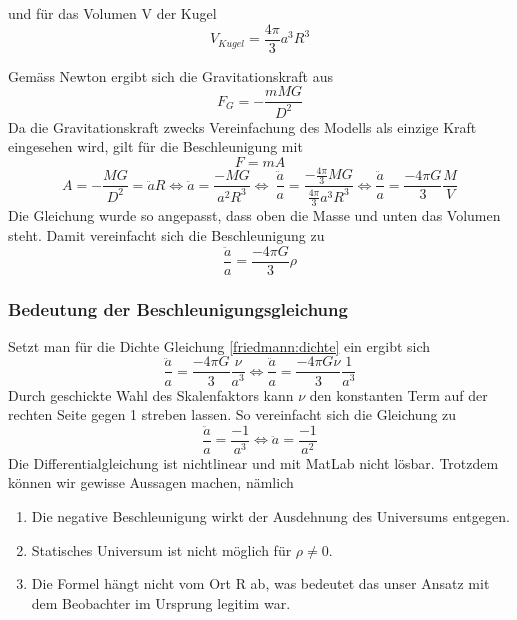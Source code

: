 \begin{refsection}
und für das Volumen V der Kugel
\[V_{Kugel} = \frac{4 \pi }{3} a^3 R^3\]

Gemäss Newton ergibt sich die Gravitationskraft aus
\begin{equation}
F_G = -\frac{m M G}{D^2}
\end{equation}
Da die Gravitationskraft zwecks Vereinfachung des Modells als einzige Kraft eingesehen wird, gilt für die Beschleunigung mit 
\[F = m A\]
\[A = - \frac{M G}{D^2} = \ddot{a} R \Leftrightarrow \ddot{a} = \frac{- M G}{a^2 R^3} \Leftrightarrow\ \frac{\ddot{a}}{a} = \frac{-\frac{4 \pi }{3} M G}{\frac{4 \pi}{3}a^3 R^3} \Leftrightarrow \frac{\ddot{a}}{a} = \frac{- 4 \pi G}{3} \frac{M}{V}\]
Die Gleichung wurde so angepasst, dass oben die Masse und unten das Volumen steht. Damit vereinfacht sich die Beschleunigung zu
\begin{equation}
\frac{\ddot{a}}{a} = \frac{- 4 \pi G}{3} \rho
\end{equation}
\subsubsection{Bedeutung der Beschleunigungsgleichung}
Setzt man für die Dichte Gleichung \ref{friedmann:dichte} ein ergibt sich
\[\frac{\ddot{a}}{a} = \frac{- 4 \pi G}{3} \frac{\nu}{a^3} \Leftrightarrow \frac{\ddot{a}}{a} = \frac{- 4 \pi G \nu}{3} \frac{1}{a^3}\]
Durch geschickte Wahl des Skalenfaktors kann $\nu$ den konstanten Term auf der rechten Seite gegen 1 streben lassen. So vereinfacht sich die Gleichung zu
\[\frac{\ddot{a}}{a} = \frac{-1}{a^3} \Leftrightarrow \ddot{a} = \frac{-1}{a^2}\]
Die Differentialgleichung ist nichtlinear und mit MatLab nicht lösbar. Trotzdem können wir gewisse Aussagen machen, nämlich
\begin{enumerate}
	\item Die negative Beschleunigung wirkt der Ausdehnung des Universums entgegen. 
	\item Statisches Universum ist nicht möglich für $\rho \neq 0$.
	\item Die Formel hängt nicht vom Ort R ab, was bedeutet das unser Ansatz mit dem Beobachter im Ursprung legitim war.
\end{enumerate}


\end{refsection}
